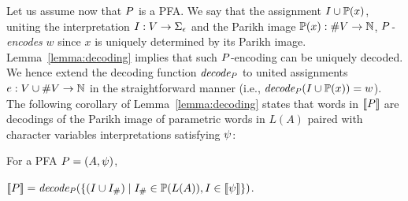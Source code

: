 \documentclass[sigplan,review,anonymous]{acmart}\settopmatter{printfolios=true,printccs=false,printacmref=false}
\begin{document}
Let us assume now that  $P$ is a PFA. We  say that the assignment $I \cup \mathbb{P}{(x)}$, uniting the interpretation $I:V\rightarrow\Sigma_\epsilon$ and the Parikh image $\mathbb{P}{(x)}:\#V\rightarrow \mathbb{N}$, \emph{$P$-encodes} $w$  since $x$ is uniquely determined by its Parikh image.  
 Lemma~\ref{lemma:decoding} implies that such $P$-encoding can be uniquely decoded. 
We  hence extend the decoding function $\mathit{decode_{P}}$ to united assignments $e:V\cup\#V \rightarrow \mathbb{N}$ in the straightforward manner (i.e.,  $\mathit{decode_{P}}(I \cup \mathbb{P}{(x)}) = w$).   
The following corollary of Lemma~\ref{lemma:decoding} states that words in $[\![P]\!]$ are decodings of the Parikh image of parametric words in $L(A)$ paired with character variables interpretations satisfying $\psi$:

\begin{corollary}\label{corollary:pfa}
For a PFA $P = (A,\psi)$,
\\
\centerline{$[\![P]\!] = \mathit{decode_{P}} (\{(I\cup I_{\#})\mid I_{\#}\in\mathbb{P}{(L(A))} ,I\in[\![\psi]\!]\})$.}
\end{corollary}
%

\end{document}
